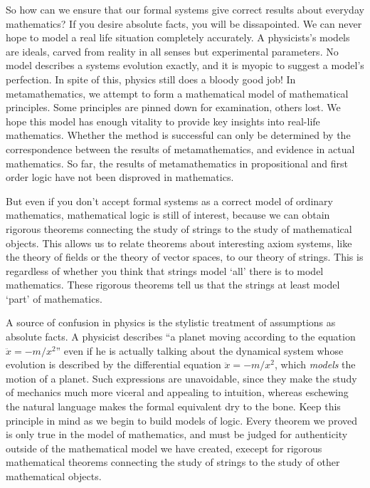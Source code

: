 So how can we ensure that our formal systems give correct results about everyday mathematics? If you desire absolute facts, you will be dissapointed. We can never hope to model a real life situation completely accurately. A physicists's models are ideals, carved from reality in all senses but experimental parameters. No model describes a systems evolution exactly, and it is myopic to suggest a model's perfection. In spite of this, physics still does a bloody good job! In metamathematics, we attempt to form a mathematical model of mathematical principles. Some principles are pinned down for examination, others lost. We hope this model has enough vitality to provide key insights into real-life mathematics. Whether the method is successful can only be determined by the correspondence between the results of metamathematics, and evidence in actual mathematics. So far, the results of metamathematics in propositional and first order logic have not been disproved in mathematics.

But even if you don't accept formal systems as a correct model of ordinary mathematics, mathematical logic is still of interest, because we can obtain rigorous theorems connecting the study of strings to the study of mathematical objects. This allows us to relate theorems about interesting axiom systems, like the theory of fields or the theory of vector spaces, to our theory of strings. This is regardless of whether you think that strings model `all' there is to model mathematics. These rigorous theorems tell us that the strings at least model `part' of mathematics.

A source of confusion in physics is the stylistic treatment of assumptions as absolute facts. A physicist describes ``a planet moving according to the equation $\ddot{x} = -m/x^2$'' even if he is actually talking about the dynamical system whose evolution is described by the differential equation $\ddot{x} = -m/x^2$, which {\it models} the motion of a planet. Such expressions are unavoidable, since they make the study of mechanics much more viceral and appealing to intuition, whereas eschewing the natural language makes the formal equivalent dry to the bone. Keep this principle in mind as we begin to build models of logic. Every theorem we proved is only true in the model of mathematics, and must be judged for authenticity outside of the mathematical model we have created, execept for rigorous mathematical theorems connecting the study of strings to the study of other mathematical objects.






